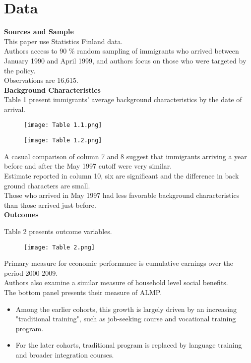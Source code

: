 \documentclass[../root]{subfiles}
\begin{document}
    \section{Data}
    {\bf Sources and Sample} \\
    This paper use Statistics Finland data. \\
    Authors access to 90 \% random sampling of immigrants who arrived between January 1990 and April 1999, and authors focus on those who were targeted by the policy. \\
    Observations are 16,615.\\
    
    {\bf Background Characteristics} \\
    Table 1 present immigrants' average background characteristics by the date of arrival.
    
    \begin{figure}[h]
        \texttt{[image: Table 1.1.png]}
    \end{figure}
    
    \begin{figure}[h]
        \texttt{[image: Table 1.2.png]}
    \end{figure}
    
    A casual comparison of column 7 and 8 suggest that immigrants arriving a year before and after the May 1997 cutoff were very similar.  \\
    
    Estimate reported in column 10, six are significant and the difference in back ground characters are small. \\
    Those who arrived in May 1997 had less favorable background characteristics than those arrived just before. \\
    
    {\bf Outcomes}
    
    Table 2 presents outcome variables.
    \begin{figure}[h]
        \texttt{[image: Table 2.png]}
    \end{figure}
    
    Primary measure for economic performance is cumulative earnings over the period 2000-2009. \\
    Authors also examine a similar measure of household level social benefits. \\
    The bottom panel presents their measure of ALMP. \\
    \begin{itemize}
        \item Among the earlier cohorts, this growth is largely driven by an increasing "traditional training", such as job-seeking course and vocational training program.
        \item For the later cohorts, traditional program is replaced by language training and broader integration courses.
    \end{itemize}
    
\end{document}

